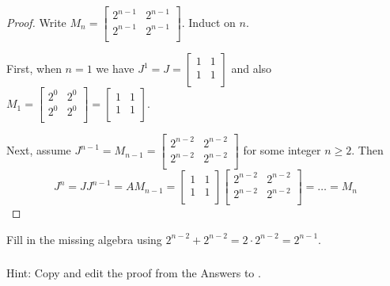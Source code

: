 \subsubsection*{ \answers}
            \begin{proof}
                Write $M_n=\left[ \begin{array}{cc} 2^{n-1} & 2^{n-1} \\ 2^{n-1} & 2^{n-1} \\ \end{array} \right]$.  Induct on $n$.  
                
                First, when $n=1$ we have $J^1 = J = \left[ \begin{array}{cc} 1 & 1 \\ 1 & 1\\ \end{array} \right]$ and also $M_1=\left[ \begin{array}{cc} 2^0 & 2^0\\ 2^0 & 2^0 \\ \end{array} \right]= \left[ \begin{array}{cc} 1 & 1 \\ 1 & 1\\ \end{array} \right]$.  
                    
                Next, assume $J^{n-1} = M_{n-1} = \left[ \begin{array}{cc} 2^{n-2} & 2^{n-2} \\ 2^{n-2} & 2^{n-2}  \\ \end{array} \right]$ for some integer $n \ge 2$.  Then
                    $$J^n = JJ^{n-1} =AM_{n-1}
                    = \left[ \begin{array}{cc} 1 & 1 \\ 1 & 1 \\ \end{array} \right]\left[ \begin{array}{cc} 2^{n-2} & 2^{n-2}\\ 2^{n-2} & 2^{n-2} \\ \end{array} \right]
                    = \ldots
                    =M_n$$
            \end{proof} 
            Fill in the missing algebra using $2^{n-2}+2^{n-2} = 2 \cdot 2^{n-2} =  2^{n-1}$.

\subsubsection*{ \answers}
Hint: Copy and edit the proof from the Answers to .

